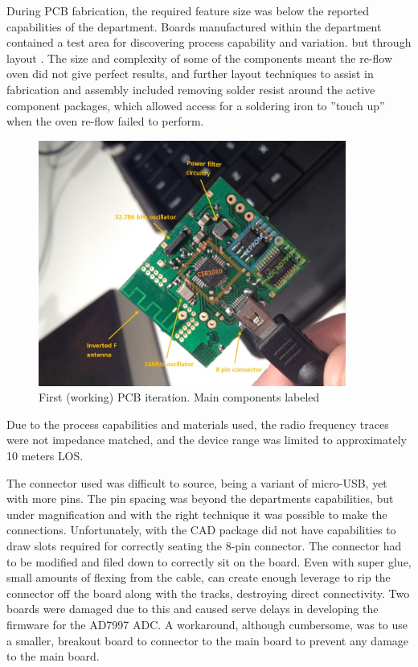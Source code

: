 \documentclass[]{article}
\begin{document}
During \ac{PCB} fabrication, the required feature size was below the reported capabilities of the department. Boards manufactured within the department contained a test area for discovering process capability and variation.  but through layout . The size and complexity of some of the components meant the re-flow oven did not give perfect results, and further layout techniques to assist in fabrication and assembly included removing solder resist around the active component packages, which allowed access for a soldering iron to ''touch up'' when the oven re-flow failed to perform. 

\begin{figure}[h]
	\begin{center}
		\includegraphics[width = 0.9\textwidth]{pcb1.jpg}
	\end{center}
	\caption{First (working) PCB iteration. Main components labeled}
	\label{fig:pcb1.jpg}
\end{figure}

Due to the process capabilities and materials used, the radio frequency traces were not impedance matched, and the device range was limited to approximately 10 meters \ac{LOS}. 

The connector used was difficult to source, being a variant of micro-USB, yet with more pins. The pin spacing was beyond the departments capabilities, but under magnification and with the right technique it was possible to make the connections. Unfortunately, with the \ac{CAD} package did not have capabilities to draw slots required for correctly seating the 8-pin connector. The connector had to be modified and filed down to correctly sit on the board. Even with super glue, small amounts of flexing from the cable, can create enough leverage to rip the connector off the board along with the tracks, destroying direct connectivity. Two boards were damaged due to this and caused serve delays in developing the firmware for the AD7997 \ac{ADC}. A workaround, although cumbersome, was to use a smaller, breakout board to connector to the main board to prevent any damage to the main board. 
\end{document}
